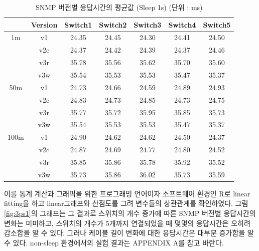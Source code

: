\documentclass[11pt
  , a4paper
  , article
  , oneside
]{memoir}
\begin{document}
\begin{table}[!htb]
\begin{center}
\begin{tabular}{c|c|c|c|c|c|c}\hline
 & Version & Switch1 & Switch2 & Switch3 & Switch4 & Switch5\\ \hline
1m & v1 & 24.35 & 24.45 & 24.30 & 24.41& 24.50 \\ 
& v2c & 24.37 & 24.42 & 24.39 & 24.37 & 24.46 \\ 
& v3r & 35.78 & 35.56 & 35.62 & 35.70 & 35.60 \\ 
& v3w & 35.54 & 35.53 & 35.53 & 35.47& 35.37 \\\hline
50m & v1 & 24.73 & 24.66 & 24.59 & 24.89& 24.93 \\ 
& v2c & 24.83 & 24.73 & 24.85 & 24.73 & 24.75 \\ 
& v3r & 35.77 & 35.72 & 35.95 & 35.85 & 35.73 \\ 
& v3w & 35.54 & 35.53 & 35.53 & 35.47& 35.37 \\\hline
100m & v1 & 24.90 & 24.62 & 24.62 & 24.50& 24.37 \\ 
& v2c & 24.87 & 24.69 & 24.77 & 24.80 & 24.52 \\ 
& v3r & 35.85 & 35.86 & 35.78 & 35.92 & 35.52 \\ 
& v3w & 35.73 & 35.86 & 36.02 & 35.73& 35.59 \\\hline \hline
\end{tabular}
\caption{SNMP 버전별 응답시간의 평균값 (Sleep 1s) (단위 : ms)}
  \label{table:s1}  
\end{center}
\end{table} 

이를 통계 계산과 그래픽을 위한 프로그래밍 언어이자 소프트웨어 환경인 R로 linear fitting을 하고 linear그래프와 산점도를 그려 변수들의 상관관계를 확인하였다. 그림 \ref{fig:3ps1}의 그래프는 그 결과로 스위치의 개수 증가에 따른 SNMP 버전별 응답시간의 변화는 미미하고, 스위치의 개수가 5개까지 연결되었을 때 몇몇의 응답시간은 오히려 감소함을 알 수 있다. 그러나 케이블 길이 변화에 대한 응답시간은 대부분 증가함을 알 수 있다. non-sleep 환경에서의 실험 결과는 APPENDIX A를 참고 바란다.
\end{document}
